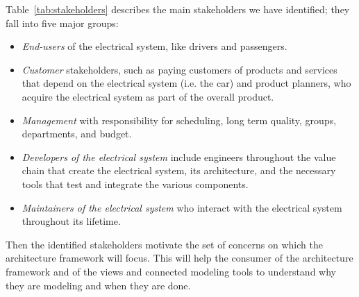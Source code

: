 Table~\ref{tab:stakeholders} describes the main stakeholders we have identified; they fall into five major groups: 

\begin{itemize}
\item \emph{End-users} of the electrical system, like drivers and passengers.
\item \emph{Customer} stakeholders, such as paying customers of products and services that depend on the electrical system (i.e. the car) and product planners, who acquire the electrical system as part of the overall product.
\item \emph{Management} with responsibility for scheduling, long term quality, groups, departments, and budget.
\item \emph{Developers of the electrical system}  include engineers throughout the value chain that create the electrical system, its architecture, and the necessary tools  that test and integrate the various components. 
\item \emph{Maintainers of the electrical system} who interact with the electrical system throughout its lifetime. 
\end{itemize}


Then the identified stakeholders motivate the set of concerns on which the architecture framework will focus.
This will help the consumer of the architecture framework and of the views and connected modeling tools to understand why
they are modeling and when they are done.

